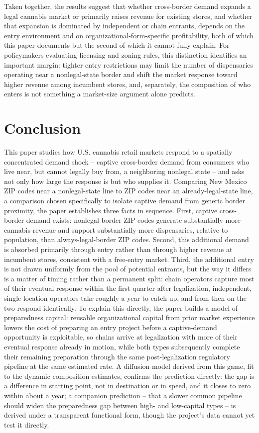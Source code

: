 \documentclass[english,12pt]{article}
\begin{document}
Taken together, the results suggest that whether cross-border demand expands a legal cannabis market or primarily raises revenue for existing stores, and whether that expansion is dominated by independent or chain entrants, depends on the entry environment and on organizational-form-specific profitability, both of which this paper documents but the second of which it cannot fully explain. For policymakers evaluating licensing and zoning rules, this distinction identifies an important margin: tighter entry restrictions may limit the number of dispensaries operating near a nonlegal-state border and shift the market response toward higher revenue among incumbent stores, and, separately, the composition of who enters is not something a market-size argument alone predicts.

\section{Conclusion}
\label{conclusion}

This paper studies how U.S. cannabis retail markets respond to a spatially concentrated demand shock -- captive cross-border demand from consumers who live near, but cannot legally buy from, a neighboring nonlegal state -- and asks not only how large the response is but who supplies it. Comparing New Mexico ZIP codes near a nonlegal-state line to ZIP codes near an already-legal-state line, a comparison chosen specifically to isolate captive demand from generic border proximity, the paper establishes three facts in sequence. First, captive cross-border demand exists: nonlegal-border ZIP codes generate substantially more cannabis revenue and support substantially more dispensaries, relative to population, than always-legal-border ZIP codes. Second, this additional demand is absorbed primarily through entry rather than through higher revenue at incumbent stores, consistent with a free-entry market. Third, the additional entry is not drawn uniformly from the pool of potential entrants, but the way it differs is a matter of timing rather than a permanent split: chain operators capture most of their eventual response within the first quarter after legalization, independent, single-location operators take roughly a year to catch up, and from then on the two respond identically. To explain this directly, the paper builds a model of preparedness capital: reusable organizational capital from prior market experience lowers the cost of preparing an entry project before a captive-demand opportunity is exploitable, so chains arrive at legalization with more of their eventual response already in motion, while both types subsequently complete their remaining preparation through the same post-legalization regulatory pipeline at the same estimated rate. A diffusion model derived from this game, fit to the dynamic composition estimates, confirms the prediction directly: the gap is a difference in starting point, not in destination or in speed, and it closes to zero within about a year; a companion prediction -- that a slower common pipeline should widen the preparedness gap between high- and low-capital types -- is derived under a transparent functional form, though the project's data cannot yet test it directly.
\end{document}
